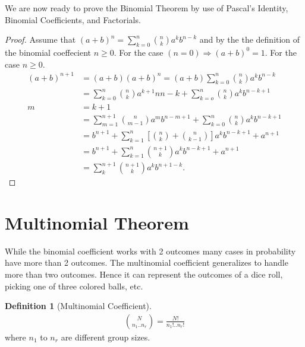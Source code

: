 \documentclass{article}
\theoremstyle{plain}
\theoremstyle{definition}
\newtheorem{definition}{Definition}
\theoremstyle{remark}
\begin{document}
We are now ready to prove the Binomial Theorem by use of Pascal's Identity, Binomial Coefficients, and Factorials.
\begin{proof}
  Assume that $(a + b)^n = \sum_{k=0}^{n} \binom{n}{k} a^kb^{n-k}$ and by the the definition of the binomial coeffecient $n \geq 0$. For the case $(n = 0) \Rightarrow (a + b)^0 = 1$. For the case $n \ge 0$.
  \begin{align*}
    (a + b)^{n+1} &= (a + b)(a + b)^n = (a+b)\sum_{k=0}^{n}\binom{n}{k}a^kb^{n-k} \\
                  &= \sum^{n}_{k=0}\binom{n}{k}a^{k+1}n{n-k} + \sum^{n}_{k=o}\binom{n}{k}a^{k}b^{n-k+1} \\
    m &= k + 1 \\
                  &= \sum^{n+1}_{m=1}\binom{n}{m-1}a^{m}b^{n-m+1}+\sum^{n}_{k=0}\binom{n}{k}a^{k}b^{n-k+1} \\
                  &= b^{n+1}+\sum^{n}_{k=1}[\binom{n}{k} + \binom{n}{k-1}]a^kb^{n-k+1}+a^{n+1}\\
                  &= b^{n+1}+\sum^{n}_{k=1}\binom{n+1}{k}a^{k}b^{n-k+1}+a^{n+1} \\
                  &= \sum^{n+1}_{k}\binom{n+1}{k}a^{k}b^{n+1-k}.
  \end{align*}
\end{proof}


\section{Multinomial Theorem}
While the binomial coefficient works with 2 outcomes many cases in probability have more than 2 outcomes. The multinomial coefficient generalizes to handle more than two outcomes. Hence it can represent the outcomes of a dice roll, picking one of three colored balls, etc.
\begin{definition}[Multinomial Coefficient]
  \begin{align*}
    \binom{N}{n_1..n_r} = \frac{N!}{n_1!..n_r!}
  \end{align*}
  where $n_1$ to $n_r$ are different group sizes.
\end{definition}
\end{document}
